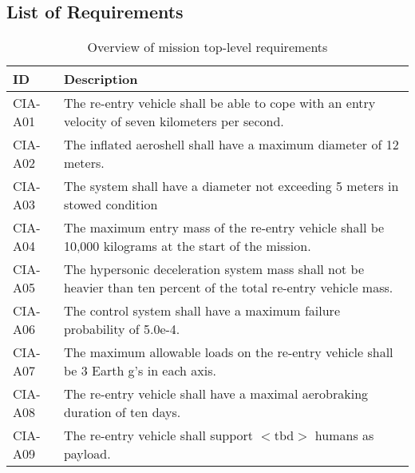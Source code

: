 \subsection{List of Requirements} \label{sec:list}

\begin{table}[H]
	\caption{Overview of mission top-level requirements}
	\begin{tabular}{|p{}|p{}|}
    \hline
    ID          & Description                                                                                                      \\ \hline \hline
    CIA-A01 & The re-entry vehicle shall be able to cope with an entry velocity of seven kilometers per second.                \\ \hline
    CIA-A02 & The inflated aeroshell shall have a maximum diameter of 12 meters.                                               \\ \hline
    CIA-A03 & The system shall have a diameter not exceeding 5 meters in stowed condition                                       \\ \hline
    CIA-A04 & The maximum entry mass of the re-entry vehicle shall be 10,000 kilograms at the start of the mission.				\\ \hline
    CIA-A05 & The hypersonic deceleration system mass shall not be heavier than ten percent of the total re-entry vehicle mass. \\ \hline
    CIA-A06 & The control system shall have a maximum failure probability of 5.0e-4.                                           \\ \hline
    CIA-A07 & The maximum allowable loads on the re-entry vehicle shall be 3 Earth g's in each axis.                            \\ \hline
    CIA-A08 & The re-entry vehicle shall have a maximal aerobraking duration of ten days.                                      \\ \hline
    CIA-A09 & The re-entry vehicle shall support $<$\gls{tbd}$>$ humans as payload.                         				            \\ \hline
    \end{tabular}
    \label{tab:toplevelreq}
\end{table}
